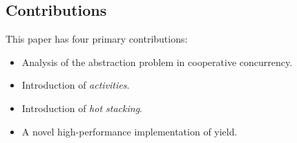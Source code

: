 \documentclass[preprint, 10pt, numbers]{sigplanconf}
\begin{document}




\subsection{Contributions}

This paper has four primary contributions:

\begin{itemize}
\item Analysis of the abstraction problem in cooperative concurrency.
\item Introduction of \emph{activities}.
\item Introduction of \emph{hot stacking}.
\item A novel high-performance implementation of yield.
\end{itemize}

\end{document}

